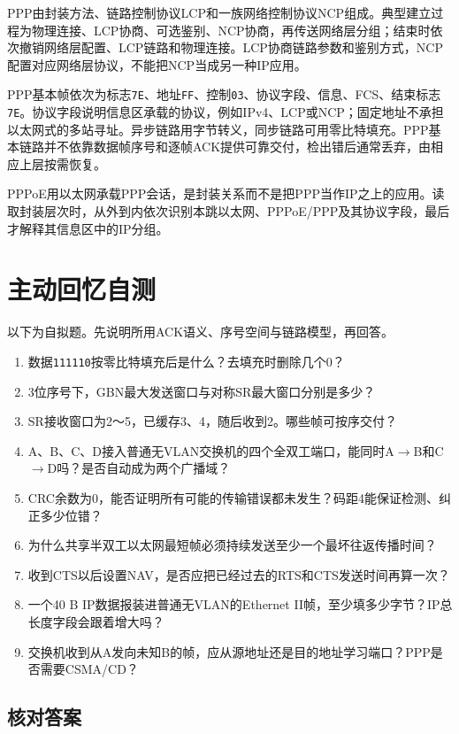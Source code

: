 PPP由封装方法、链路控制协议LCP和一族网络控制协议NCP组成。典型建立过程为物理连接、LCP协商、可选鉴别、NCP协商，再传送网络层分组；结束时依次撤销网络层配置、LCP链路和物理连接。LCP协商链路参数和鉴别方式，NCP配置对应网络层协议，不能把NCP当成另一种IP应用。

PPP基本帧依次为标志\texttt{7E}、地址\texttt{FF}、控制\texttt{03}、协议字段、信息、FCS、结束标志\texttt{7E}。协议字段说明信息区承载的协议，例如IPv4、LCP或NCP；固定地址不承担以太网式的多站寻址。异步链路用字节转义，同步链路可用零比特填充。PPP基本链路并不依靠数据帧序号和逐帧ACK提供可靠交付，检出错后通常丢弃，由相应上层按需恢复。

PPPoE用以太网承载PPP会话，是封装关系而不是把PPP当作IP之上的应用。读取封装层次时，从外到内依次识别本跳以太网、PPPoE/PPP及其协议字段，最后才解释其信息区中的IP分组。

\section{主动回忆自测}\label{CN03-review}

以下为自拟题。先说明所用ACK语义、序号空间与链路模型，再回答。

\begin{enumerate}
\def\labelenumi{\arabic{enumi}.}
\tightlist
\item
  数据\texttt{111110}按零比特填充后是什么？去填充时删除几个0？
\item
  3位序号下，GBN最大发送窗口与对称SR最大窗口分别是多少？
\item
  SR接收窗口为2～5，已缓存3、4，随后收到2。哪些帧可按序交付？
\item
  A、B、C、D接入普通无VLAN交换机的四个全双工端口，能同时A\ensuremath{\to}B和C\ensuremath{\to}D吗？是否自动成为两个广播域？
\item
  CRC余数为0，能否证明所有可能的传输错误都未发生？码距4能保证检测、纠正多少位错？
\item
  为什么共享半双工以太网最短帧必须持续发送至少一个最坏往返传播时间？
\item
  收到CTS以后设置NAV，是否应把已经过去的RTS和CTS发送时间再算一次？
\item
  一个40 B IP数据报装进普通无VLAN的Ethernet II帧，至少填多少字节？IP总长度字段会跟着增大吗？
\item
  交换机收到从A发向未知B的帧，应从源地址还是目的地址学习端口？PPP是否需要CSMA/CD？
\end{enumerate}

\subsection{核对答案}\label{CN03-review-answers}

